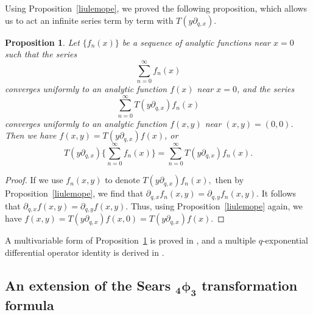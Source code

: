 \documentclass[pdftex]{sigma}
\numberwithin{equation}{section}
\newtheorem{Proposition}[Theorem]{Proposition}
 { \theoremstyle{definition}
\newtheorem{Definition}[Theorem]{Definition}
\newtheorem{Note}[Theorem]{Note}
\newtheorem{Example}[Theorem]{Example}
\newtheorem{Remark}[Theorem]{Remark} }
\begin{document}
Using Proposition~\ref{liulemope}, we \cite[Proposition~13.9]{LiuRam2013} proved the following proposition, which allows us to act an infinite series term by term with $T(y\partial_{q, x})$.
\begin{Proposition} \label{liuopeppf}Let $\{f_n(x)\}$ be a sequence of analytic functions near $x=0$
	such that the series
	\[
	\sum_{n=0}^\infty f_n(x)
	\]
	converges uniformly to an analytic function $f(x)$ near $x=0$, and the series
	\[
	\sum_{n=0}^\infty T(y\partial_{q, x})f_n(x)
	\]
	converges uniformly to an analytic function $f(x, y)$ near $(x, y)=(0, 0)$. Then we have
	$f(x, y)=T(y\partial_{q, x})f(x)$, or
	\[
	T(y\partial_{q, x})\Biggl\{\sum_{n=0}^\infty f_n(x)\Biggr\}=\sum_{n=0}^\infty T(y\partial_{q, x})f_n(x).
	\]
\end{Proposition}
\begin{proof} If we use $f_n(x, y)$ to denote $T(y\partial_{q, x})f_n(x), $ then by Proposition~\ref{liulemope}, we find that $\partial_{q, x}f_n(x, y)=\partial_{q, y}f_n(x, y)$. It follows that
	$\partial_{q, x}f(x, y)=\partial_{q, y}f(x, y)$. Thus, using Proposition~\ref{liulemope} again,
	we have
	$
	f(x, y)=T(y\partial_{q, x})f(x, 0)=T(y\partial_{q, x})f(x).
	$
\end{proof}

A multivariable form of Proposition~\ref{liuopeppf} is proved in \cite{Liu2023Acta}, and a multiple $q$-exponential differential
operator identity is derived in \cite{Liu2023ActaSci}.

\subsection[An extension of the Sears \_4phi\_3 transformation formula]{An extension of the Sears $\boldsymbol{_4\phi_3}$ transformation formula}
\end{document}
